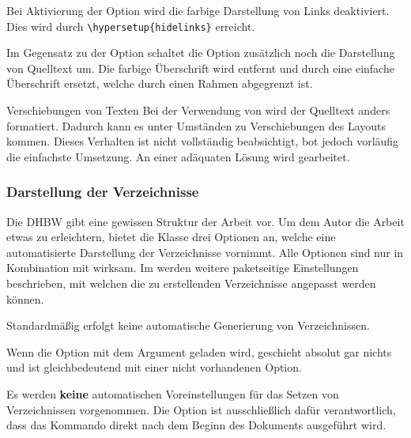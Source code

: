 \documentclass[babel=english,highlight=false]{skdoc}
\begin{document}
                Bei Aktivierung der Option wird die farbige Darstellung von Links deaktiviert. Dies wird durch \verb|\hypersetup{hidelinks}| erreicht.\medskip

                Im Gegensatz zu der Option  schaltet die Option zusätzlich noch die Darstellung von Quelltext um. Die farbige Überschrift wird entfernt und durch eine einfache Überschrift ersetzt, welche durch einen Rahmen abgegrenzt ist.

                \begin{warning}{Verschiebungen von Texten}
                    Bei der Verwendung von  wird der Quelltext anders formatiert. Dadurch kann es unter Umständen zu Verschiebungen des Layouts kommen. Dieses Verhalten ist nicht vollständig beabsichtigt, bot jedoch vorläufig die einfachste Umsetzung. An einer adäquaten Lösung wird gearbeitet.
                \end{warning}

            \subsubsection{Darstellung der Verzeichnisse}
                Die DHBW gibt eine gewissen Struktur der Arbeit vor. Um dem Autor die Arbeit etwas zu erleichtern, bietet die Klasse drei Optionen an, welche eine automatisierte Darstellung der Verzeichnisse vornimmt. Alle Optionen sind nur in Kombination mit  wirksam. Im  werden weitere paketseitige Einstellungen beschrieben, mit welchen die zu erstellenden Verzeichnisse angepasst werden können.\medskip

                Standardmäßig erfolgt keine automatische Generierung von Verzeichnissen.

                Wenn die Option mit dem Argument  geladen wird, geschieht absolut gar nichts und ist gleichbedeutend mit einer nicht vorhandenen Option.

                Es werden \textbf{keine} automatischen Voreinstellungen für das Setzen von Verzeichnissen vorgenommen. Die Option ist ausschließlich dafür verantwortlich, dass das Kommando \Macro\dhbwprintintro direkt nach dem Beginn des Dokuments ausgeführt wird.\medskip
\end{document}
